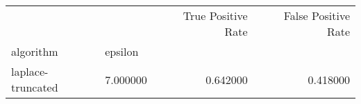 \begin{tabular}{llrr}
\toprule
 &  & True Positive Rate & False Positive Rate \\
algorithm & epsilon &  &  \\
\midrule
laplace-truncated & 7.000000 & 0.642000 & 0.418000 \\
\cline{1-4}
\bottomrule
\end{tabular}
